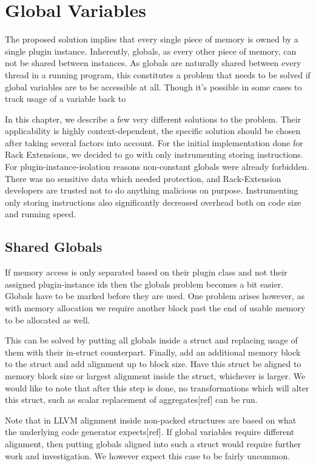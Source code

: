 \chapter {Global Variables}

The proposed solution implies that every single piece of memory is owned by a
single plugin instance. Inherently, globals, as every other piece of memory, can
not be shared between instances. As globals are naturally shared between every
thread in a running program, this constitutes a problem that needs to be solved
if global variables are to be accessible at all. Though it's possible in some
cases to track usage of a variable back to 

In this chapter, we describe a few very different solutions to the problem.
Their applicability is highly context-dependent, the specific solution should be
chosen after taking several factors into account. For the initial implementation
done for Rack Extensions, we decided to go with only instrumenting storing
instructions. For plugin-instance-isolation reasons non-constant globals were
already forbidden. There was no sensitive data which needed protection, and
Rack-Extension developers are trusted not to do anything malicious on purpose.
Instrumenting only storing instructions also significantly decreased overhead
both on code size and running speed.


\section {Shared Globals}

If memory access is only separated based on their plugin class and not their
assigned plugin-instance ids then the globals problem becomes a bit easier.
Globals have to be marked before they are used. One problem arises however, as
with memory allocation we require another block past the end of usable memory to
be allocated as well.

This can be solved by putting all globals inside a struct and replacing usage of
them with their in-struct counterpart. Finally, add an additional memory block
to the struct and add alignment up to block size. Have this struct be aligned to
memory block size or largest alignment inside the struct, whichever is larger.
We would like to note that after this step is done, no transformations which
will alter this struct, such as scalar replacement of aggregates[ref] can be
run.

Note that in LLVM alignment inside non-packed structures are based on what the
underlying code generator expects[ref]. If global variables require different
alignment, then putting globals aligned into such a struct would require further
work and investigation. We however expect this case to be fairly uncommon.

